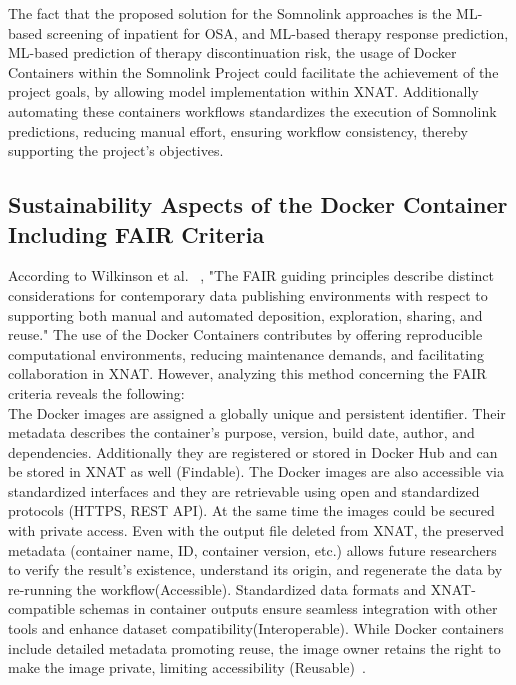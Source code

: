 The fact that the proposed solution for the Somnolink approaches is the ML-based screening of inpatient for OSA, and ML-based therapy response prediction, ML-based prediction of therapy discontinuation risk, the usage of Docker Containers within the Somnolink Project could facilitate the achievement of the project goals, by allowing model implementation within XNAT. Additionally  automating these containers workflows standardizes the execution of Somnolink predictions, reducing manual effort, ensuring workflow consistency, thereby supporting the project's objectives.\\









\subsection{Sustainability Aspects of the Docker Container Including FAIR Criteria}

According to Wilkinson et al. ~\cite{FAIR}, "The FAIR guiding principles describe distinct considerations for contemporary data publishing environments with respect to supporting both manual and automated deposition, exploration, sharing, and reuse."
The use of the Docker Containers contributes by offering reproducible computational environments, reducing maintenance demands, and facilitating collaboration in XNAT. However, analyzing this method concerning the FAIR criteria reveals the following:\\
The Docker images are assigned a globally unique and persistent identifier. Their metadata describes the container’s purpose, version, build date, author, and dependencies. Additionally they are registered or stored in Docker Hub and can be stored in XNAT as well (Findable).
The Docker images are also accessible via standardized interfaces and they are retrievable using open and standardized protocols (HTTPS, REST API). At the same time the images could be secured with private access. Even with the output file deleted from XNAT, the preserved metadata (container name, ID, container version, etc.) allows future researchers to verify the result's existence, understand its origin, and regenerate the data by re-running the workflow(Accessible). Standardized data formats and XNAT-compatible schemas in container outputs ensure seamless integration with other tools and enhance dataset compatibility(Interoperable). While Docker containers include detailed metadata promoting reuse, the image owner retains the right to make the image private, limiting accessibility (Reusable)~\cite{FAIR}.

